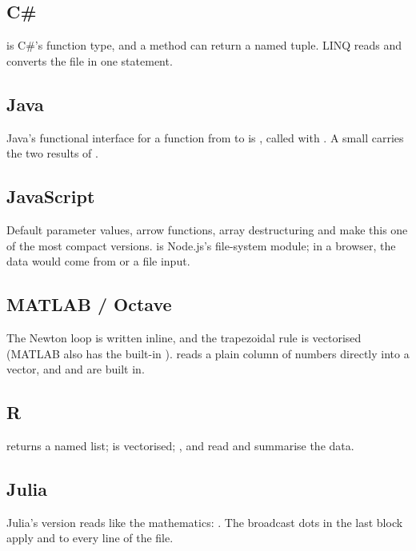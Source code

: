 \subsection*{C\#}
 is C\#'s function type, and a method can return a named
tuple. LINQ reads and converts the file in one statement.

\subsection*{Java}
Java's functional interface for a function from  to  is
, called with . A small 
carries the two results of .

\subsection*{JavaScript}
Default parameter values, arrow functions, array destructuring and  make
this one of the most compact versions.  is Node.js's file-system
module; in a browser, the data would come from  or a file input.

\subsection*{MATLAB / Octave}
The Newton loop is written inline, and the trapezoidal rule is vectorised (MATLAB also has
the built-in ).  reads a plain column of numbers directly into a
vector, and  and  are built in.

\subsection*{R}
 returns a named list;  is vectorised; ,
 and  read and summarise the data.

\subsection*{Julia}
Julia's version reads like the mathematics: . The broadcast dots
in the last block apply  and  to every line of the file.

